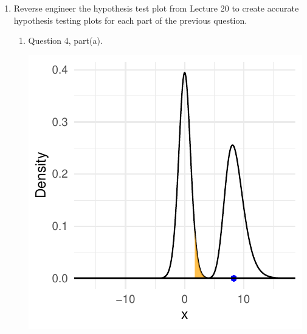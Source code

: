 \documentclass{article}\usepackage[]{graphicx}\usepackage[]{xcolor}
\makeatletter
\def\maxwidth{ %
  \ifdim\Gin@nat@width>\linewidth
    \linewidth
  \else
    \Gin@nat@width
  \fi
}
\newcommand{\hlkwd}[1]{\textcolor[rgb]{0.737,0.353,0.396}{\textbf{#1}}}%
\newenvironment{kframe}{%
 \def\at@end@of@kframe{}%
 \ifinner\ifhmode%
  \def\at@end@of@kframe{\end{minipage}}%
  \begin{minipage}{\columnwidth}%
 \fi\fi%
 \def\FrameCommand##1{\hskip\@totalleftmargin \hskip-\fboxsep
 \colorbox{shadecolor}{##1}\hskip-\fboxsep
     \hskip-\linewidth \hskip-\@totalleftmargin \hskip\columnwidth}%
 \MakeFramed {\advance\hsize-\width
   \@totalleftmargin\z@ \linewidth\hsize
   \@setminipage}}%
 {\par\unskip\endMakeFramed%
 \at@end@of@kframe}
\newenvironment{knitrout}{}{} %
\makeatother
\begin{document}
\begin{enumerate}
\begin{enumerate}
\begin{knitrout}
\begin{kframe}
\begin{alltt}
(t = -7.778, p < 0.0001; g = -1.51; 95%
\end{alltt}
\end{kframe}
\end{knitrout}
  \item ``The difference between populations was significant ($p=1.04 \times10^{-8}$).''
\begin{knitrout}\scriptsize
{}\color{fgcolor}\begin{kframe}
\begin{alltt}
\hlkwd{t.test}(data$difference)
\hlkwd{hedges_g}(x = data$difference)

(t = 8.5109, p < 0.0001; g = 1.65; 95%
\end{alltt}
\end{kframe}
\end{knitrout}
\end{enumerate}
\item Reverse engineer the hypothesis test plot from Lecture 20 to create accurate
hypothesis testing plots for each part of the previous question.
\begin{enumerate}
  \item Question 4, part(a).

\begin{center}
\begin{knitrout}
\color{fgcolor}
\includegraphics[width=\maxwidth]{figure/unnamed-chunk-10-1} 
\end{knitrout}
\end{center}



\end{enumerate}
\end{enumerate}
\end{document}
